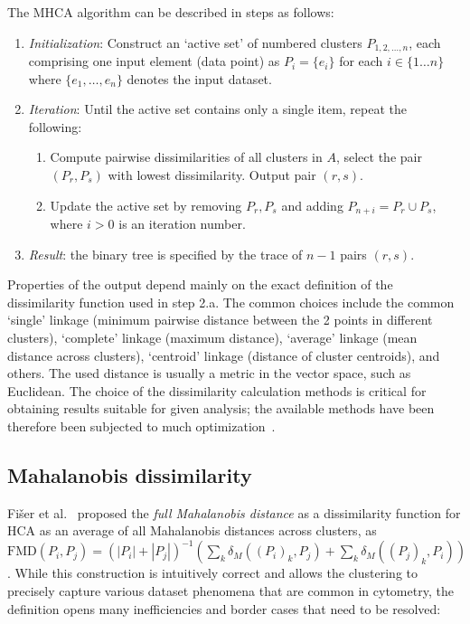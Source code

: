 The MHCA algorithm can be described in steps as follows:
\begin{enumerate}
	\item \emph{Initialization}: Construct an `active set' of numbered clusters $P_{1,2,\dots,n}$, each comprising one input element (data point) as $P_i=\{e_i\}$ for each $i \in \{1\ldots n\}$ where $\{e_1,\dots,e_n\}$ denotes the input dataset.
	\item \emph{Iteration}: Until the active set contains only a single item, repeat the following:

	\begin{enumerate}
		\item Compute pairwise dissimilarities of all clusters in $A$, select the pair $(P_r, P_s)$ with lowest dissimilarity. Output pair $(r,s)$.
		\item Update the active set by removing $P_r, P_s$ and adding $P_{n+i} = P_r\cup P_s$, where $i>0$ is an iteration number.
	\end{enumerate}

	\item \emph{Result}: the binary tree is specified by the trace of $n-1$ pairs $(r,s)$.
\end{enumerate}

Properties of the output depend mainly on the exact definition of the dissimilarity function used in step 2.a.
The common choices include the common `single' linkage (minimum pairwise distance between the 2 points in different clusters), `complete' linkage (maximum distance), `average' linkage (mean distance across clusters), `centroid' linkage (distance of cluster centroids), and others.
The used distance is usually a metric in the vector space, such as Euclidean.
The choice of the dissimilarity calculation methods is critical for obtaining results suitable for given analysis; the available methods have been therefore been subjected to much optimization~\cite{shirkhorshidi2015comparison}.

\subsection{Mahalanobis dissimilarity}

Fišer et al.~\cite{fivser2012detection} proposed the \emph{full Mahalanobis distance} as a dissimilarity function for HCA as an average of all Mahalanobis distances across clusters, as $\text{FMD}(P_i, P_j) = (|P_i|+|P_j|)^{-1} \left(\sum_k \delta_M((P_i)_k, P_j) + \sum_k\delta_M((P_j)_k, P_i)\right)$.
While this construction is intuitively correct and allows the clustering to precisely capture various dataset phenomena that are common in cytometry, the definition opens many inefficiencies and border cases that need to be resolved:

